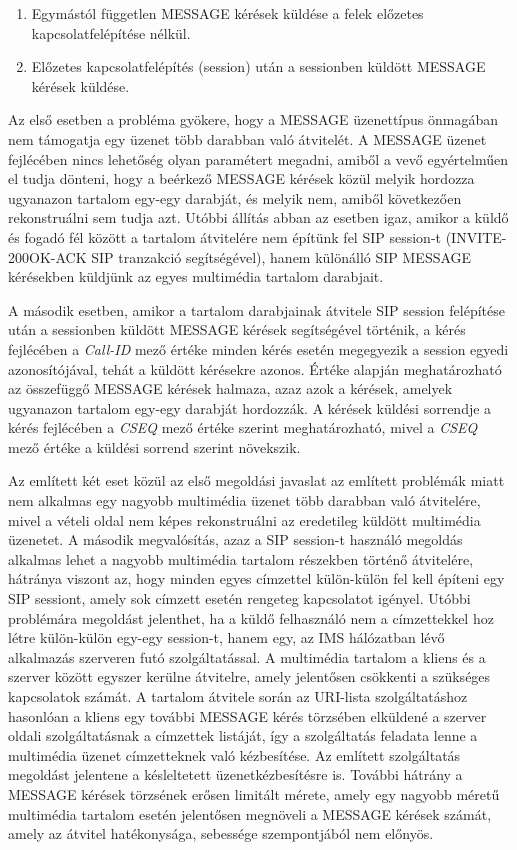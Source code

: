 \begin{enumerate}\itemsep1pt
\item	Egymástól független MESSAGE kérések küldése a felek előzetes kapcsolatfelépítése nélkül.
\item Előzetes kapcsolatfelépítés (session) után a sessionben küldött MESSAGE kérések küldése. 
\end{enumerate}

Az első esetben a probléma gyökere, hogy a MESSAGE üzenettípus önmagában nem támogatja egy üzenet több darabban való átvitelét. A MESSAGE üzenet fejlécében nincs lehetőség olyan paramétert megadni, amiből a vevő egyértelműen el tudja dönteni, hogy a beérkező MESSAGE kérések közül melyik hordozza ugyanazon tartalom egy-egy darabját, és melyik nem, amiből következően rekonstruálni sem tudja azt. Utóbbi állítás abban az esetben igaz, amikor a küldő és fogadó fél között a tartalom átvitelére nem építünk fel SIP session-t (INVITE-200OK-ACK SIP tranzakció segítségével), hanem különálló SIP MESSAGE kérésekben küldjünk az egyes multimédia tartalom darabjait. 

A második esetben, amikor a tartalom darabjainak átvitele SIP session felépítése után a sessionben küldött MESSAGE kérések segítségével történik, a kérés fejlécében a \emph{Call-ID} mező értéke minden kérés esetén megegyezik a session egyedi azonosítójával, tehát a küldött kérésekre azonos. Értéke alapján meghatározható az összefüggő MESSAGE kérések halmaza, azaz azok a kérések, amelyek ugyanazon tartalom egy-egy darabját hordozzák. A kérések küldési sorrendje a kérés fejlécében a \emph{CSEQ} mező értéke szerint meghatározható, mivel a \emph{CSEQ} mező értéke a küldési sorrend szerint növekszik. 

Az említett két eset közül az első megoldási javaslat az említett problémák miatt nem alkalmas egy nagyobb multimédia üzenet több darabban való átvitelére, mivel a vételi oldal nem képes rekonstruálni az eredetileg küldött multimédia üzenetet. A második megvalósítás, azaz a SIP session-t használó megoldás alkalmas lehet a nagyobb multimédia tartalom részekben történő átvitelére, hátránya viszont az, hogy minden egyes címzettel külön-külön fel kell építeni egy SIP sessiont, amely sok címzett esetén rengeteg kapcsolatot igényel. Utóbbi problémára megoldást jelenthet, ha a küldő felhasználó nem a címzettekkel hoz létre külön-külön egy-egy session-t, hanem egy, az IMS hálózatban lévő alkalmazás szerveren futó szolgáltatással. A multimédia tartalom a kliens és a szerver között egyszer kerülne átvitelre, amely jelentősen csökkenti a szükséges kapcsolatok számát. A tartalom átvitele során az URI-lista szolgáltatáshoz hasonlóan a kliens egy további MESSAGE kérés törzsében elküldené a szerver oldali szolgáltatásnak a címzettek listáját, így a szolgáltatás feladata lenne a multimédia üzenet címzetteknek való kézbesítése. Az említett szolgáltatás megoldást jelentene a késleltetett üzenetkézbesítésre is. További hátrány a MESSAGE kérések törzsének erősen limitált mérete, amely egy nagyobb méretű multimédia tartalom esetén jelentősen megnöveli a MESSAGE kérések számát, amely az átvitel hatékonysága, sebessége szempontjából nem előnyös.

